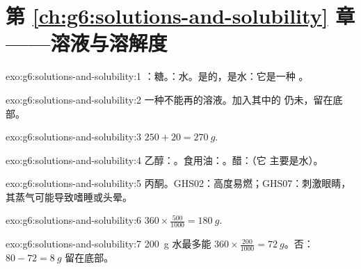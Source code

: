 \section*{第 \ref{ch:g6:solutions-and-solubility} 章——溶液与溶解度}

\begin{solution}{exo:g6:solutions-and-solubility:1}
：糖。：水。是的，是水：它是一种
。
\end{solution}

\begin{solution}{exo:g6:solutions-and-solubility:2}
一种不能再的溶液。加入其中的
仍未，留在底部。
\end{solution}

\begin{solution}{exo:g6:solutions-and-solubility:3}
$250 + 20 = \qty{270}{g}$.
\end{solution}

\begin{solution}{exo:g6:solutions-and-solubility:4}
乙醇：。食用油：。醋：（它
主要是水）。
\end{solution}

\begin{solution}{exo:g6:solutions-and-solubility:5}
丙酮。GHS02：高度易燃；GHS07：刺激眼睛，
其蒸气可能导致嗜睡或头晕。
\end{solution}

\begin{solution}{exo:g6:solutions-and-solubility:6}
$360 \times \frac{500}{1000} = \qty{180}{g}$.
\end{solution}

\begin{solution}{exo:g6:solutions-and-solubility:7}
\qty{200}{g} 水最多能 $360 \times \frac{200}{1000} =
\qty{72}{g}$。否：$80 - 72 = \qty{8}{g}$ 留在底部。
\end{solution}

